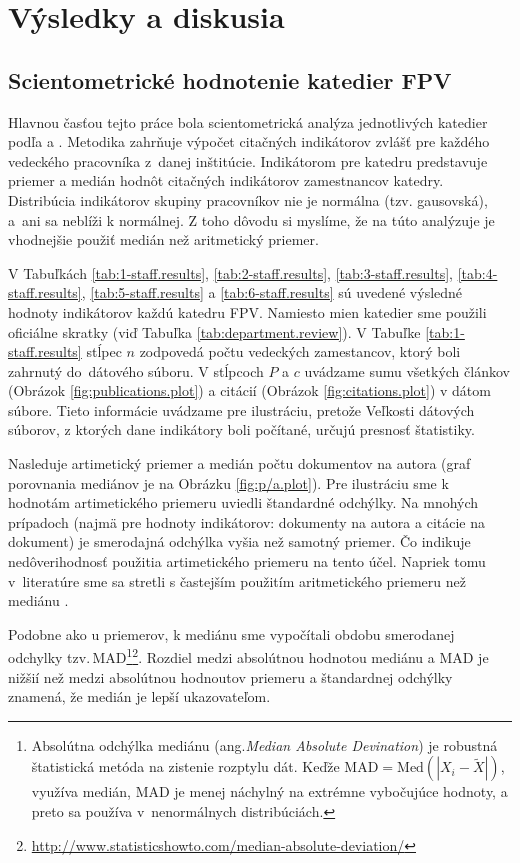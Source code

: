 \chapter{Výsledky a diskusia}

\section{Scientometrické hodnotenie katedier FPV}

Hlavnou časťou tejto práce bola scientometrická analýza jednotlivých katedier
podľa \citet{Kazakis2014a} a \citet{Kazakis2014b,Kazakis2015}. Metodika zahrňuje
výpočet citačných indikátorov zvlášť pre každého vedeckého pracovníka 
z~danej inštitúcie. Indikátorom pre katedru predstavuje priemer a medián 
hodnôt citačných indikátorov zamestnancov katedry. 
Distribúcia indikátorov skupiny pracovníkov nie je normálna (tzv. gausovská), 
a~ani sa neblíži k normálnej. Z toho dôvodu si myslíme, že na túto analýzuje je
vhodnejšie použiť medián než aritmetický priemer.  

V Tabuľkách  \ref{tab:1-staff.results}, \ref{tab:2-staff.results},
\ref{tab:3-staff.results}, \ref{tab:4-staff.results}, \ref{tab:5-staff.results}
a \ref{tab:6-staff.results} sú uvedené výsledné hodnoty indikátorov každú
katedru FPV.  Namiesto mien katedier sme použili oficiálne skratky (viď Tabuľka
\ref{tab:department.review}).  V Tabuľke  \ref{tab:1-staff.results} stĺpec $n$
zodpovedá počtu vedeckých zamestancov, ktorý boli zahrnutý do~dátového súboru.
V stĺpcoch $P$ a $c$ uvádzame sumu všetkých článkov (Obrázok
\ref{fig:publications.plot}) a citácií (Obrázok \ref{fig:citations.plot})
v dátom súbore.  Tieto informácie uvádzame pre ilustráciu, pretože Veľkosti
dátových súborov, z ktorých dane indikátory boli počítané, určujú presnosť
štatistiky. 

Nasleduje artimetický priemer a medián počtu dokumentov na autora (graf
porovnania mediánov je na Obrázku \ref{fig:p/a.plot}).  Pre ilustráciu sme k
hodnotám artimetického priemeru uviedli štandardné odchýlky.  Na mnohých
prípadoch (najmä pre hodnoty indikátorov: dokumenty na autora a citácie na dokument)
je smerodajná odchýlka vyšia než samotný priemer. Čo indikuje nedôverihodnosť
použitia artimetického priemeru na tento účel. Napriek tomu v~literatúre sme sa
stretli s častejším použitím aritmetického priemeru než mediánu
\citep{Lazaridis2010}.  

Podobne ako u priemerov, k mediánu sme vypočítali obdobu smerodanej odchylky
tzv.\,MAD\footnote{Absolútna odchýlka mediánu
(ang.\emph{Median Absolute Devination}) je robustná štatistická metóda na
zistenie rozptylu dát. Keďže $\mathrm{MAD} = \mathrm{Med}(|X_i - \tilde{X}|)$,
využíva medián, MAD je menej náchylný na extrémne vybočujúce hodnoty, a preto
sa používa v~nenormálnych
distribúciách.}\footnote{\url{http://www.statisticshowto.com/median-absolute-deviation/}}.
Rozdiel medzi absolútnou hodnotou mediánu a MAD je nižšií 
než medzi absolútnou hodnoutov priemeru a štandardnej odchýlky znamená, že
medián je lepší ukazovateľom.

